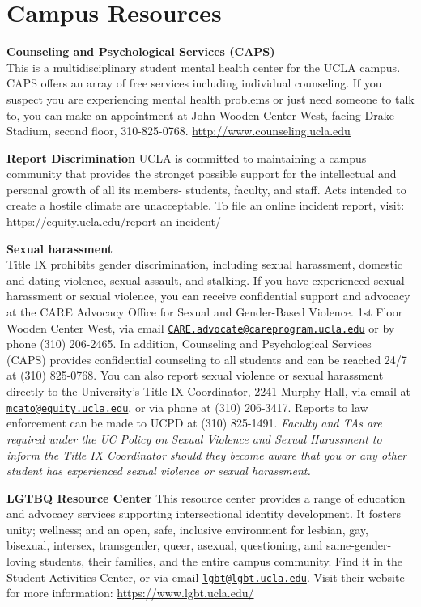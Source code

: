 \documentclass[11pt,]{article}
\begin{document}
\section{Campus Resources}\label{campus-resources}

\textbf{Counseling and Psychological Services (CAPS)}\\
This is a multidisciplinary student mental health center for the UCLA
campus. CAPS offers an array of free services including individual
counseling. If you suspect you are experiencing mental health problems
or just need someone to talk to, you can make an appointment at John
Wooden Center West, facing Drake Stadium, second floor, 310-825-0768.
\url{http://www.counseling.ucla.edu}

\textbf{Report Discrimination} UCLA is committed to maintaining a campus
community that provides the stronget possible support for the
intellectual and personal growth of all its members- students, faculty,
and staff. Acts intended to create a hostile climate are unacceptable.
To file an online incident report, visit:
\url{https://equity.ucla.edu/report-an-incident/}

\textbf{Sexual harassment}\\
Title IX prohibits gender discrimination, including sexual harassment,
domestic and dating violence, sexual assault, and stalking. If you have
experienced sexual harassment or sexual violence, you can receive
confidential support and advocacy at the CARE Advocacy Office for Sexual
and Gender-Based Violence. 1st Floor Wooden Center West, via email
\href{mailto:CARE.advocate@careprogram.ucla.edu}{\nolinkurl{CARE.advocate@careprogram.ucla.edu}}
or by phone (310) 206-2465. In addition, Counseling and Psychological
Services (CAPS) provides confidential counseling to all students and can
be reached 24/7 at (310) 825-0768. You can also report sexual violence
or sexual harassment directly to the University's Title IX Coordinator,
2241 Murphy Hall, via email at
\href{mailto:mcato@equity.ucla.edu}{\nolinkurl{mcato@equity.ucla.edu}},
or via phone at (310) 206-3417. Reports to law enforcement can be made
to UCPD at (310) 825-1491. \emph{Faculty and TAs are required under the
UC Policy on Sexual Violence and Sexual Harassment to inform the Title
IX Coordinator should they become aware that you or any other student
has experienced sexual violence or sexual harassment.}

\textbf{LGTBQ Resource Center} This resource center provides a range of
education and advocacy services supporting intersectional identity
development. It fosters unity; wellness; and an open, safe, inclusive
environment for lesbian, gay, bisexual, intersex, transgender, queer,
asexual, questioning, and same-gender-loving students, their families,
and the entire campus community. Find it in the Student Activities
Center, or via email
\href{mailto:lgbt@lgbt.ucla.edu}{\nolinkurl{lgbt@lgbt.ucla.edu}}. Visit
their website for more information: \url{https://www.lgbt.ucla.edu/}
\end{document}
